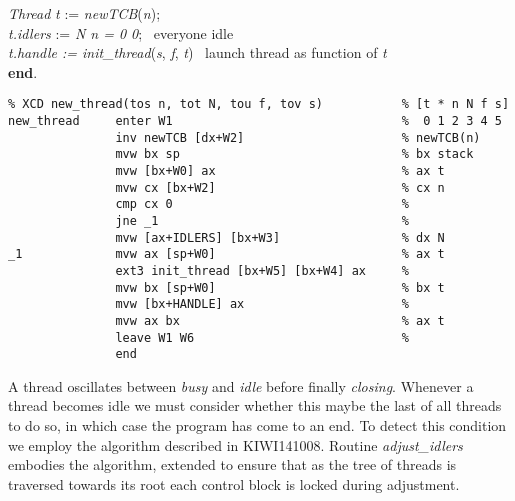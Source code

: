\begin{tabbing}
\indents
{}
\vb\>\>\emph{Thread} \emph{t} := \emph{newTCB}(\emph{n}); \\
\vb\>\>\emph{t.idlers} := \emph{N  n = 0  0};
   \>\>\>\>\>\>\>\>\>\> \rmk\ everyone idle\\
\vb\>\>\emph{t.handle := init\_thread}(\emph{s}, \emph{f}, \emph{t})
   \>\>\>\>\>\>\>\>\>\> \rmk\ launch thread as function of \emph{t}\\
\vb\>\textbf{end}.
\end{tabbing}

{\small
\begin{verbatim}
% XCD new_thread(tos n, tot N, tou f, tov s)           % [t * n N f s]
new_thread     enter W1                                %  0 1 2 3 4 5
               inv newTCB [dx+W2]                      % newTCB(n)
               mvw bx sp                               % bx stack
               mvw [bx+W0] ax                          % ax t
               mvw cx [bx+W2]                          % cx n
               cmp cx 0                                %
               jne _1                                  %
               mvw [ax+IDLERS] [bx+W3]                 % dx N
_1             mvw ax [sp+W0]                          % ax t
               ext3 init_thread [bx+W5] [bx+W4] ax     %
               mvw bx [sp+W0]                          % bx t
               mvw [bx+HANDLE] ax                      %
               mvw ax bx                               % ax t
               leave W1 W6                             %
               end
\end{verbatim}}

A thread oscillates between \emph{busy} and \emph{idle} before finally \emph{closing}. Whenever a thread becomes idle we must consider whether this maybe the last of all threads to do so, in which case the program has come to an end. To detect this condition we employ the algorithm described in \textsf{KIWI141008}. Routine \emph{adjust\_idlers} embodies the algorithm, extended to ensure that as the tree of threads is traversed towards its root each control block is locked during adjustment.

